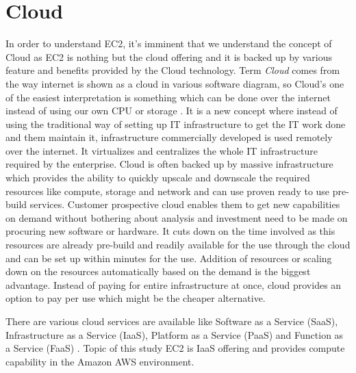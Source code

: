\section{Cloud}
In order to understand EC2, it's imminent that we understand the concept of Cloud as EC2 is nothing but the cloud offering and it is backed up by various feature and benefits provided by the Cloud technology.  Term \emph{Cloud} comes from the way internet is shown as a cloud in various software diagram, so Cloud's one of the easiest interpretation is something which can be done over the internet instead of using our own CPU or storage \cite{www-infoworld}. It is a new concept where instead of using the traditional way of setting up IT infrastructure to get the IT work done and them maintain it, infrastructure commercially developed is used remotely over the internet. It virtualizes and centralizes the whole IT infrastructure required by the enterprise. Cloud is often backed up by massive infrastructure which provides the ability to quickly upscale and downscale the required resources like compute, storage and network and can use proven ready to use pre-build services. Customer prospective cloud enables them to get new capabilities on demand without bothering about analysis and investment need to be made on procuring new software or hardware. It cuts down on the time involved as this resources are already pre-build and readily available for the use through the cloud and can be set up within minutes for the use. Addition of resources or scaling down on the resources automatically based on the demand is the biggest advantage. Instead of paying for entire infrastructure at once, cloud provides an option to pay per use which might be the cheaper alternative.

There are various cloud services are available like Software as a Service (SaaS), Infrastructure as a Service (IaaS), Platform as a Service (PaaS) and Function as a Service (FaaS) \cite{www-infoworld}. Topic of this study EC2 is IaaS offering and provides compute capability in the Amazon AWS environment.


